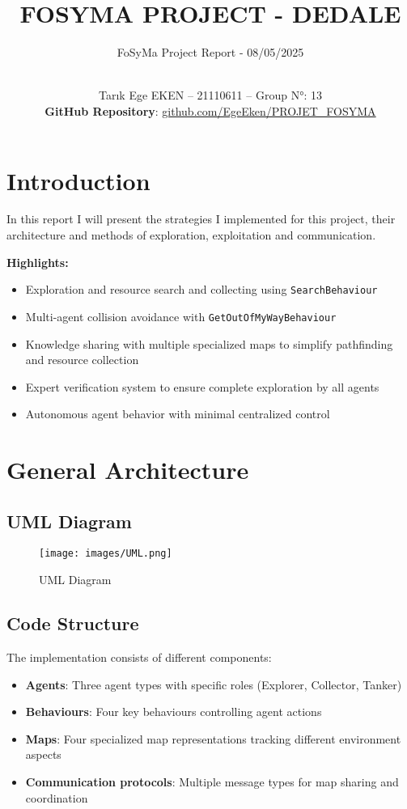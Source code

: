 \documentclass[a4paper, 12pt]{article}
\institute{Sorbonne University}
\title{FOSYMA PROJECT - DEDALE}
\subtitle{FoSyMa Project Report -  08/05/2025}
\author{
\\Tarık Ege \textsc{EKEN} -- 21110611 -- Group N°: 13\\
\textbf{GitHub Repository}: {\href{https://github.com/EgeEken/PROJET_FOSYMA}{github.com/EgeEken/PROJET\_FOSYMA}}
}
\begin{document}
\maketitle
\tableofcontents
\newpage

\section {Introduction}
In this report I will present the strategies I implemented for this project, their architecture and methods of exploration, exploitation and communication.

\textbf{Highlights:}
\begin{itemize}
  \item Exploration and resource search and collecting using \texttt{SearchBehaviour}
  \item Multi-agent collision avoidance with \texttt{GetOutOfMyWayBehaviour}
  \item Knowledge sharing with multiple specialized maps to simplify pathfinding and resource collection
  \item Expert verification system to ensure complete exploration by all agents
  \item Autonomous agent behavior with minimal centralized control
\end{itemize}

\section{General Architecture}

\subsection{UML Diagram}
\begin{figure}[H]
        \centering
        \texttt{[image: images/UML.png]}
        \caption{UML Diagram}
\end{figure}

\subsection{Code Structure}
The implementation consists of different components:

\begin{itemize}
  \item \textbf{Agents}: Three agent types with specific roles (Explorer, Collector, Tanker)
  \item \textbf{Behaviours}: Four key behaviours controlling agent actions
  \item \textbf{Maps}: Four specialized map representations tracking different environment aspects
  \item \textbf{Communication protocols}: Multiple message types for map sharing and coordination
\end{itemize}
\end{document}

